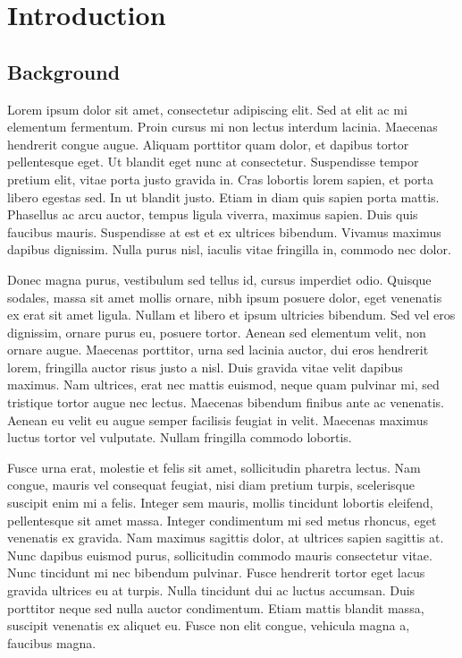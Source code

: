 \chapter{Introduction}
\label{chap:Introduction}

\ifpdf
    \graphicspath{{Chapter1/Figs/Raster/}{Chapter1/Figs/PDF/}{Chapter1/Figs/}}
\else
    \graphicspath{{Chapter1/Figs/Vector/}{Chapter1/Figs/}}
\fi


\section{Background}
Lorem ipsum dolor sit amet, consectetur adipiscing elit. Sed at elit ac mi elementum fermentum. Proin cursus mi non lectus interdum lacinia. Maecenas hendrerit congue augue. Aliquam porttitor quam dolor, et dapibus tortor pellentesque eget. Ut blandit eget nunc at consectetur. Suspendisse tempor pretium elit, vitae porta justo gravida in. Cras lobortis lorem sapien, et porta libero egestas sed. In ut blandit justo. Etiam in diam quis sapien porta mattis. Phasellus ac arcu auctor, tempus ligula viverra, maximus sapien. Duis quis faucibus mauris. Suspendisse at est et ex ultrices bibendum. Vivamus maximus dapibus dignissim. Nulla purus nisl, iaculis vitae fringilla in, commodo nec dolor.

Donec magna purus, vestibulum sed tellus id, cursus imperdiet odio. Quisque sodales, massa sit amet mollis ornare, nibh ipsum posuere dolor, eget venenatis ex erat sit amet ligula. Nullam et libero et ipsum ultricies bibendum. Sed vel eros dignissim, ornare purus eu, posuere tortor. Aenean sed elementum velit, non ornare augue. Maecenas porttitor, urna sed lacinia auctor, dui eros hendrerit lorem, fringilla auctor risus justo a nisl. Duis gravida vitae velit dapibus maximus. Nam ultrices, erat nec mattis euismod, neque quam pulvinar mi, sed tristique tortor augue nec lectus. Maecenas bibendum finibus ante ac venenatis. Aenean eu velit eu augue semper facilisis feugiat in velit. Maecenas maximus luctus tortor vel vulputate. Nullam fringilla commodo lobortis.

Fusce urna erat, molestie et felis sit amet, sollicitudin pharetra lectus. Nam congue, mauris vel consequat feugiat, nisi diam pretium turpis, scelerisque suscipit enim mi a felis. Integer sem mauris, mollis tincidunt lobortis eleifend, pellentesque sit amet massa. Integer condimentum mi sed metus rhoncus, eget venenatis ex gravida. Nam maximus sagittis dolor, at ultrices sapien sagittis at. Nunc dapibus euismod purus, sollicitudin commodo mauris consectetur vitae. Nunc tincidunt mi nec bibendum pulvinar. Fusce hendrerit tortor eget lacus gravida ultrices eu at turpis. Nulla tincidunt dui ac luctus accumsan. Duis porttitor neque sed nulla auctor condimentum. Etiam mattis blandit massa, suscipit venenatis ex aliquet eu. Fusce non elit congue, vehicula magna a, faucibus magna.

